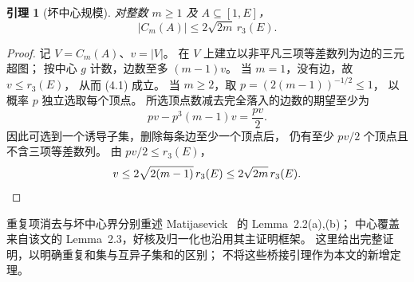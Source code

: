 \documentclass[UTF8,a4paper,11pt,fontset=none]{ctexart}
\newtheorem{lemma}[theorem]{引理}
\theoremstyle{remark}
\begin{document}
\begin{lemma}[坏中心规模]\label{lem:bad}
对整数 $m\ge1$ 及 $A\subseteq[1,E]$，
\[
 |C_m(A)|\le2\sqrt{2m}\,r_3(E). \tag{4.1}\label{eq:bad}
\]
\end{lemma}
\begin{proof}
记 $V=C_m(A)$、$v=|V|$。
在 $V$ 上建立以非平凡三项等差数列为边的三元超图；
按中心 $g$ 计数，边数至多 $(m-1)v$。
当 $m=1$，没有边，故 $v\le r_3(E)$，
从而 (4.1) 成立。
当 $m\ge2$，取
$p=(2(m-1))^{-1/2}\le1$，
以概率 $p$ 独立选取每个顶点。
所选顶点数减去完全落入的边数的期望至少为
\[
 pv-p^3(m-1)v=\frac{pv}{2}.
\]
因此可选到一个诱导子集，删除每条边至少一个顶点后，
仍有至少 $pv/2$ 个顶点且不含三项等差数列。
由 $pv/2\le r_3(E)$，
\[
 v\le2\sqrt{2(m-1)}\,r_3(E)
       \le2\sqrt{2m}\,r_3(E).\qedhere
\]
\end{proof}
重复项消去与坏中心界分别重述
Matijasevick~\cite{Matijasevick2026} 的 Lemma~2.2(a),(b)；
中心覆盖来自该文的 Lemma~2.3，好核及归一化也沿用其主证明框架。
这里给出完整证明，以明确重复和集与互异子集和的区别；
不将这些桥接引理作为本文的新增定理。
\end{document}
